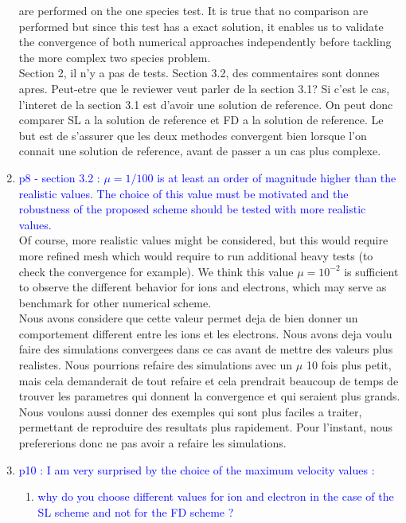 \documentclass{article}
\begin{document}
\begin{enumerate}
    are performed on the one species test. It is true that no comparison are performed  but since this test has a exact solution, 
    it enables us to validate the convergence of both numerical approaches independently before tackling the more complex two species problem. \\
    {\small Section 2, il n'y a pas de tests.
Section 3.2, des commentaires sont donnes apres. Peut-etre que le reviewer veut parler de la section 3.1?
Si c'est le cas, l'interet de la section 3.1 est d'avoir une solution de reference. On peut donc comparer SL a la solution de reference et FD a la solution de reference.
Le but est de s'assurer que les deux methodes convergent bien lorsque l'on connait une solution de reference, avant de passer a un cas plus complexe.}
    \item \textcolor{blue}{p8 - section 3.2 : $\mu = 1/100$ is at least an order of magnitude higher than the realistic values. The choice of this value must be motivated and the robustness of the proposed scheme should be tested with more realistic values.} \\
    Of course, more realistic values might be considered, but this would require more refined mesh which would require 
    to run additional heavy tests (to check the convergence for example). We think this value $\mu=10^{-2}$ is sufficient 
    to observe the different behavior for ions and electrons, which may serve as benchmark for other numerical scheme. \\
    {\small Nous avons considere que cette valeur permet deja de bien donner un comportement different entre les ions et les electrons. Nous avons deja voulu faire des simulations convergees dans ce cas
avant de mettre des valeurs plus realistes. Nous pourrions refaire des simulations avec un $\mu$ 10 fois plus petit, mais cela demanderait de tout refaire et cela prendrait beaucoup de temps
de trouver les parametres qui donnent la convergence et qui seraient plus grands. Nous voulons aussi donner des exemples qui sont plus faciles a traiter, permettant de reproduire des resultats plus rapidement. 
Pour l'instant, nous prefererions donc ne pas avoir a refaire les simulations.}
    \item \textcolor{blue}{p10 : I am very surprised by the choice of the maximum velocity values :}
    \begin{enumerate}
\item \textcolor{blue}{ why do you choose different values for ion and electron in the case of the SL scheme
and not for the FD scheme ?} \\

\end{enumerate}
\end{enumerate}
\end{document}
